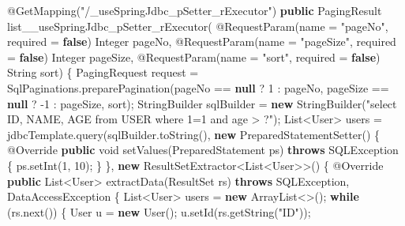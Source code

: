 \documentclass[
]{book}
\newenvironment{Shaded}{\begin{snugshade}}{\end{snugshade}}
\newcommand{\AttributeTok}[1]{\textcolor[rgb]{0.77,0.63,0.00}{#1}}
\newcommand{\BuiltInTok}[1]{#1}
\newcommand{\DataTypeTok}[1]{\textcolor[rgb]{0.13,0.29,0.53}{#1}}
\newcommand{\DecValTok}[1]{\textcolor[rgb]{0.00,0.00,0.81}{#1}}
\newcommand{\FunctionTok}[1]{\textcolor[rgb]{0.00,0.00,0.00}{#1}}
\newcommand{\KeywordTok}[1]{\textcolor[rgb]{0.13,0.29,0.53}{\textbf{#1}}}
\newcommand{\NormalTok}[1]{#1}
\newcommand{\StringTok}[1]{\textcolor[rgb]{0.31,0.60,0.02}{#1}}
\begin{document}
\begin{Shaded}
\begin{Highlighting}[]
{    \AttributeTok{@GetMapping}\NormalTok{(}\StringTok{"/_useSpringJdbc_pSetter_rExecutor"}\NormalTok{)}
    \KeywordTok{public}\NormalTok{ PagingResult }\FunctionTok{list__useSpringJdbc_pSetter_rExecutor}\NormalTok{(}
            \AttributeTok{@RequestParam}\NormalTok{(name = }\StringTok{"pageNo"}\NormalTok{, required = }\KeywordTok{false}\NormalTok{) }\BuiltInTok{Integer}\NormalTok{ pageNo,}
            \AttributeTok{@RequestParam}\NormalTok{(name = }\StringTok{"pageSize"}\NormalTok{, required = }\KeywordTok{false}\NormalTok{) }\BuiltInTok{Integer}\NormalTok{ pageSize,}
            \AttributeTok{@RequestParam}\NormalTok{(name = }\StringTok{"sort"}\NormalTok{, required = }\KeywordTok{false}\NormalTok{) }\BuiltInTok{String}\NormalTok{ sort) \{}
\NormalTok{        PagingRequest request = SqlPaginations.}\FunctionTok{preparePagination}\NormalTok{(pageNo == }\KeywordTok{null}\NormalTok{ ? }\DecValTok{1}\NormalTok{ : pageNo, pageSize == }\KeywordTok{null}\NormalTok{ ? -}\DecValTok{1}\NormalTok{ : pageSize, sort);}
        \BuiltInTok{StringBuilder}\NormalTok{ sqlBuilder = }\KeywordTok{new} \BuiltInTok{StringBuilder}\NormalTok{(}\StringTok{"select ID, NAME, AGE from USER where 1=1 and age > ?"}\NormalTok{);}
        \BuiltInTok{List}\NormalTok{<User> users = jdbcTemplate.}\FunctionTok{query}\NormalTok{(sqlBuilder.}\FunctionTok{toString}\NormalTok{(), }\KeywordTok{new} \FunctionTok{PreparedStatementSetter}\NormalTok{() \{}
            \AttributeTok{@Override}
            \KeywordTok{public} \DataTypeTok{void} \FunctionTok{setValues}\NormalTok{(}\BuiltInTok{PreparedStatement}\NormalTok{ ps) }\KeywordTok{throws} \BuiltInTok{SQLException}\NormalTok{ \{}
\NormalTok{                ps.}\FunctionTok{setInt}\NormalTok{(}\DecValTok{1}\NormalTok{, }\DecValTok{10}\NormalTok{);}
\NormalTok{            \}}
\NormalTok{        \}, }\KeywordTok{new}\NormalTok{ ResultSetExtractor<}\BuiltInTok{List}\NormalTok{<User>>() \{}
            \AttributeTok{@Override}
            \KeywordTok{public} \BuiltInTok{List}\NormalTok{<User> }\FunctionTok{extractData}\NormalTok{(}\BuiltInTok{ResultSet}\NormalTok{ rs) }\KeywordTok{throws} \BuiltInTok{SQLException}\NormalTok{, DataAccessException \{}
                \BuiltInTok{List}\NormalTok{<User> users = }\KeywordTok{new} \BuiltInTok{ArrayList}\NormalTok{<>();}
                \KeywordTok{while}\NormalTok{ (rs.}\FunctionTok{next}\NormalTok{()) \{}
\NormalTok{                    User u = }\KeywordTok{new} \FunctionTok{User}\NormalTok{();}
\NormalTok{                    u.}\FunctionTok{setId}\NormalTok{(rs.}\FunctionTok{getString}\NormalTok{(}\StringTok{"ID"}\NormalTok{));}
}
\end{Highlighting}
\end{Shaded}
\end{document}
